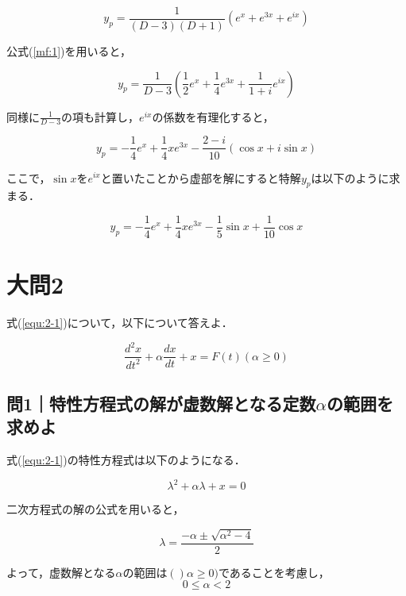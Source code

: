 \documentclass[a4paper,11pt]{bxjsarticle}
\begin{document}
\begin{equation}
  y_p = \frac{1}{(D - 3)(D + 1)}(e^x + e^{3x} + e^{ix})
\end{equation}

公式(\ref{mf:1})を用いると，

\begin{equation}
  y_p = \frac{1}{D - 3}(\frac{1}{2}e^x + \frac{1}{4}e^{3x} + \frac{1}{1+i}e^{ix})
\end{equation}

同様に$\frac{1}{D-3}$の項も計算し，$e^{ix}$の係数を有理化すると，

\begin{equation}
  y_p = -\frac{1}{4}e^x + \frac{1}{4}xe^{3x} - \frac{2 - i}{10}(\cos x + i\sin x)
\end{equation}

ここで，$\sin x$を$e^{ix}$と置いたことから虚部を解にすると特解$y_p$は以下のように求まる．

\begin{equation}
  y_p = -\frac{1}{4}e^x + \frac{1}{4}xe^{3x} - \frac{1}{5}\sin x + \frac{1}{10}\cos x
\end{equation}

\section{大問2}
式(\ref{equ:2-1})について，以下について答えよ．

\begin{equation}
  \frac{d^2x}{dt^2}+\alpha \frac{dx}{dt}+x=F(t)　(\alpha \geq 0)
  \label{equ:2-1}
\end{equation}

\subsection{問1｜特性方程式の解が虚数解となる定数$\alpha$の範囲を求めよ}
式(\ref{equ:2-1})の特性方程式は以下のようになる．

\begin{equation}
  \lambda^2 + \alpha \lambda + x = 0
\end{equation}

二次方程式の解の公式を用いると，

\begin{equation}
 \lambda = \frac{-\alpha \pm \sqrt{\alpha^2 - 4}}{2}
 \label{equ:2-2}
\end{equation}

よって，虚数解となる$\alpha$の範囲は$()\alpha \geq 0)$であることを考慮し，
\begin{equation}
  0 \leq \alpha < 2
\end{equation}
\end{document}
